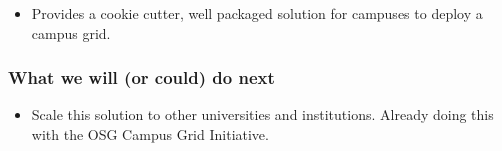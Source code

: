 \documentclass[11pt]{article}
\begin{document}
\begin{itemize}


\item
Provides a cookie cutter, well packaged solution for campuses to deploy a campus grid.

\end{itemize}



\subsubsection*{What we will (or could) do next}
\begin{itemize}

\item 
Scale this solution to other universities and institutions.  Already doing this with the OSG Campus Grid Initiative.

\end{itemize}






\end{document}
